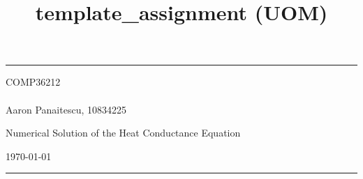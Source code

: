 \documentclass[a4paper]{article} %
\begin{document}

\title{template_assignment (UOM)} %
\fancyhead[C]{}
\hrule \medskip %
\begin{minipage}{0.295\textwidth} %
\raggedright
COMP36212\\ %
\footnotesize %
\hfill\\
Aaron Panaitescu, 10834225%
\end{minipage}
\begin{minipage}{0.4\textwidth} %
\centering 
\large %
Numerical Solution of the Heat Conductance Equation
\\ %
\end{minipage}
\begin{minipage}{0.295\textwidth} %
\raggedleft
\today\\ %
\end{minipage}
\medskip\hrule %
\bigskip

\end{document}

